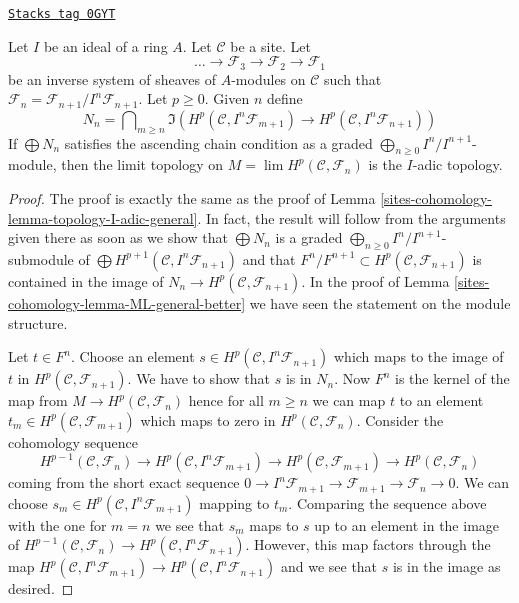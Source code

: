 \begin{lemma}
\label{sites-cohomology-lemma-topology-I-adic-general-better}
\href{https://stacks.math.columbia.edu/tag/0GYT}{\texttt{Stacks tag 0GYT}}

Let $I$ be an ideal of a ring $A$. Let $\mathcal{C}$ be a site. Let
$$
\ldots \to \mathcal{F}_3 \to \mathcal{F}_2 \to \mathcal{F}_1
$$
be an inverse system of sheaves of $A$-modules on $\mathcal{C}$ such that
$\mathcal{F}_n = \mathcal{F}_{n + 1}/I^n\mathcal{F}_{n + 1}$.
Let $p \geq 0$. Given $n$ define
$$
N_n =
\bigcap\nolimits_{m \geq n}
\Im\left(
H^p(\mathcal{C}, I^n\mathcal{F}_{m + 1}) \to
H^p(\mathcal{C}, I^n\mathcal{F}_{n + 1})
\right)
$$
If $\bigoplus N_n$ satisfies the ascending chain condition as a graded
$\bigoplus_{n \geq 0} I^n/I^{n + 1}$-module, then
the limit topology on $M = \lim H^p(\mathcal{C}, \mathcal{F}_n)$
is the $I$-adic topology.
\end{lemma}

\begin{proof}
The proof is exactly the same as the proof of
Lemma \ref{sites-cohomology-lemma-topology-I-adic-general}.
In fact, the result will follow from the arguments given there
as soon as we show that
$\bigoplus N_n$ is a graded $\bigoplus_{n \geq 0} I^n/I^{n + 1}$-submodule
of $\bigoplus H^{p + 1}(\mathcal{C}, I^n\mathcal{F}_{n + 1})$
and that $F^n/F^{n + 1} \subset H^p(\mathcal{C}, \mathcal{F}_{n + 1})$
is contained in the image of $N_n \to H^p(\mathcal{C}, \mathcal{F}_{n + 1})$.
In the proof of Lemma \ref{sites-cohomology-lemma-ML-general-better}
we have seen the statement on the module structure.

\medskip\noindent
Let $t \in F^n$. Choose an element
$s \in H^p(\mathcal{C}, I^n\mathcal{F}_{n + 1})$
which maps to the image of $t$ in $H^p(\mathcal{C}, \mathcal{F}_{n + 1})$.
We have
to show that $s$ is in $N_n$. Now $F^n$ is the kernel of the map from
$M \to H^p(\mathcal{C}, \mathcal{F}_n)$ hence for all $m \geq n$ we can map $t$
to an element $t_m \in H^p(\mathcal{C}, \mathcal{F}_{m + 1})$ which maps
to zero in $H^p(\mathcal{C}, \mathcal{F}_n)$. Consider the cohomology sequence
$$
H^{p - 1}(\mathcal{C}, \mathcal{F}_n) \to
H^p(\mathcal{C}, I^n\mathcal{F}_{m + 1}) \to
H^p(\mathcal{C}, \mathcal{F}_{m + 1}) \to
H^p(\mathcal{C}, \mathcal{F}_n)
$$
coming from the short exact sequence
$0 \to I^n\mathcal{F}_{m + 1} \to \mathcal{F}_{m + 1} \to \mathcal{F}_n \to 0$.
We can choose $s_m \in H^p(\mathcal{C}, I^n\mathcal{F}_{m + 1})$
mapping to $t_m$.
Comparing the sequence above with the one for $m = n$ we see that
$s_m$ maps to $s$ up to an element in the image of
$H^{p - 1}(\mathcal{C}, \mathcal{F}_n) \to
H^p(\mathcal{C}, I^n\mathcal{F}_{n + 1})$.
However, this map factors through the map
$H^p(\mathcal{C}, I^n\mathcal{F}_{m + 1}) \to
H^p(\mathcal{C}, I^n\mathcal{F}_{n + 1})$
and we see that $s$ is in the image as desired.
\end{proof}

